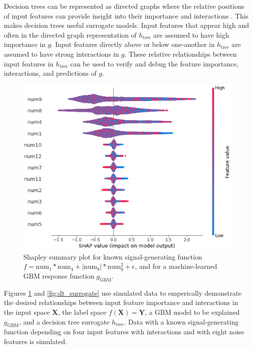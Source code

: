 \documentclass[11pt]{asaproc}
\begin{document}
Decision trees can be represented as directed graphs where the relative positions of input features can provide insight into their importance and interactions \cite{cart}. This makes decision trees useful surrogate models. Input features that appear high and often in the directed graph representation of $h_{\text{tree}}$ are assumed to have high importance in $g$. Input features directly above or below one-another in $h_{\text{tree}}$ are assumed to have strong interactions in $g$. These relative relationships between input features in $h_{\text{tree}}$ can be used to verify and debug the feature importance, interactions, and predictions of $g$.

\begin{figure}
	\begin{center}
		\includegraphics[scale=0.4]{img/figure_2.eps}
		\caption{Shapley summary plot for known signal-generating function $f = \text{num} _1 * \text{num}_4 + |\text{num}_8| * \text{num}_9^2 + e$, and for a machine-learned GBM response function $g_{\text{GBM}}$.}
		\label{fig:global_shapley}
	\end{center}
\end{figure}

Figures \ref{fig:global_shapley} and \ref{fig:dt_surrogate} use simulated data to emperically demonstrate the desired relationships between input feature importance and interactions in the input space $\mathbf{X}$, the label space $f(\mathbf{X}) = \mathbf{Y}$, a GBM model to be explained $g_{\text{GBM}}$, and a decision tree surrogate $h_{\text{tree}}$. Data with a known signal-generating function depending on four input features with interactions and with eight noise features is simulated. 
\end{document}

